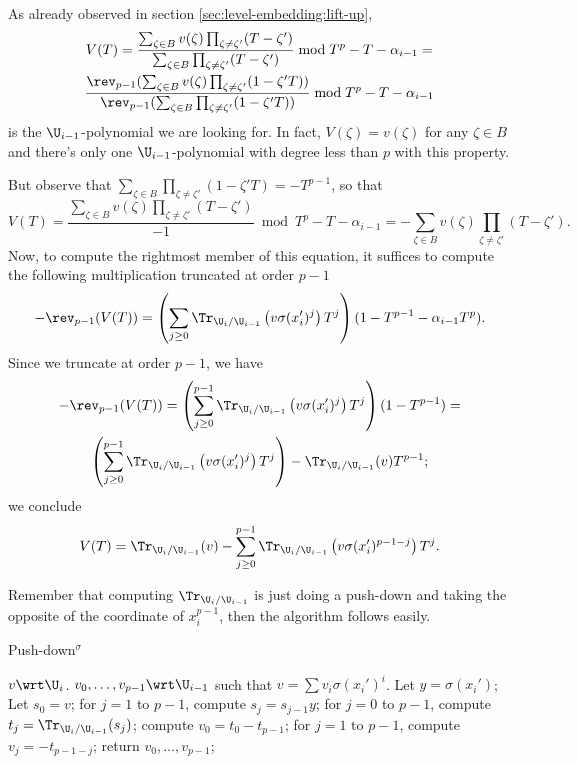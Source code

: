 As already observed in section \ref{sec:level-embedding:lift-up}, 
\begin{multline*}
  V(T) =
  \frac{\sum_{\zeta\in B}v(\zeta)\prod_{\zeta\ne\zeta'}(T-\zeta')}
       {\sum_{\zeta\in B}\prod_{\zeta\ne\zeta'}(T-\zeta')} 
       \bmod T^p-T-\alpha_{i-1} = \\
  \frac{\rev_{p-1}(\sum_{\zeta\in B}v(\zeta)\prod_{\zeta\ne\zeta'}(1-\zeta'T))}
       {\rev_{p-1}(\sum_{\zeta\in B}\prod_{\zeta\ne\zeta'}(1-\zeta'T))}
       \bmod T^p-T-\alpha_{i-1}
\end{multline*}
is the $\U_{i-1}$-polynomial we are looking for. In fact,
$V(\zeta)=v(\zeta)$ for any $\zeta\in B$ and there's only one
$\U_{i-1}$-polynomial with degree less than $p$ with this property.

But observe that $\sum_{\zeta\in B}\prod_{\zeta\ne\zeta'}(1-\zeta'T) =
-T^{p-1}$, so that
\begin{equation*}
  V(T) =
  \frac{\sum_{\zeta\in B}v(\zeta)\prod_{\zeta\ne\zeta'}(T-\zeta')}{-1} 
  \bmod T^p-T-\alpha_{i-1} =
  -\sum_{\zeta\in B}v(\zeta)\prod_{\zeta\ne\zeta'}(T-\zeta')
  \text{.}
\end{equation*}
Now, to compute the rightmost member of this equation, it suffices to
compute the following multiplication truncated at order $p-1$
\begin{equation*}
  -\rev_{p-1}(V(T)) =
  \left(\sum_{j\ge0}\Tr_{\U_i/\U_{i-1}}\left(v\sigma(x_i')^j\right)T^j\right)
  (1-T^{p-1}-\alpha_{i-1}T^p)
  \text{.}
\end{equation*}
Since we truncate at order $p-1$, we have
\begin{multline*}
  -\rev_{p-1}(V(T)) =
  \left(\sum_{j\ge0}^{p-1}\Tr_{\U_i/\U_{i-1}}\left(v\sigma(x_i')^j\right)T^j\right)
  (1-T^{p-1}) =\\
  \left(\sum_{j\ge0}^{p-1}\Tr_{\U_i/\U_{i-1}}\left(v\sigma(x_i')^j\right)T^j\right)
  - \Tr_{\U_i/\U_{i-1}}(v)T^{p-1}
  \text{;}
\end{multline*}
we conclude
\begin{equation*}
  V(T) =
  \Tr_{\U_i/\U_{i-1}}(v) -
  \sum_{j\ge0}^{p-1}\Tr_{\U_i/\U_{i-1}}\left(v\sigma(x_i')^{p-1-j}\right)T^j 
  \text{.}
\end{equation*}

Remember that computing $\Tr_{\U_i/\U_{i-1}}$ is just doing a push-down
and taking the opposite of the coordinate of $x_i^{p-1}$, then the
algorithm  follows easily.

\begin{algorithm}
  \caption{Push-down$^\sigma$}
  \begin{algorithmic}[1]
    \REQUIRE $v\wrt\U_i$.
    \ENSURE $v_0,\ldots,v_{p-1}\wrt\U_{i-1}$ such that $v = \sum v_i\sigma(x_i')^i$.
    \STATE Let $y = \sigma(x_i')$;
    \STATE Let $s_0 = v$;
    \STATE \label{alg:push-sigma:sigmas}for $j = 1$ to $p-1$, compute $s_j
    = s_{j-1}y$;
    \STATE \label{alg:push-sigma:traces}for $j = 0$ to $p-1$, compute $t_j
    = \Tr_{\U_i/\U_{i-1}}(s_j)$;
    \STATE compute $v_0 = t_0 - t_{p-1}$;
    \STATE for $j = 1$ to $p-1$, compute $v_j = -t_{p-1-j}$;
    \STATE return $v_0, \ldots, v_{p-1}$;
  \end{algorithmic}
\end{algorithm}

